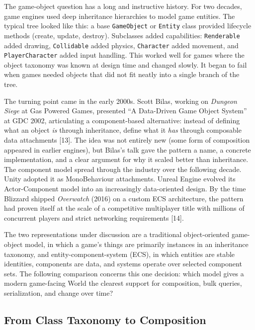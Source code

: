 \documentclass[
  11pt,
  letterpaper,
  DIV=11,
  numbers=noendperiod,
  twoside,
  open=right]{scrreprt}
\begin{document}
The game-object question has a long and instructive history. For two
decades, game engines used deep inheritance hierarchies to model game
entities. The typical tree looked like this: a base \texttt{GameObject}
or \texttt{Entity} class provided lifecycle methods (create, update,
destroy). Subclasses added capabilities: \texttt{Renderable} added
drawing, \texttt{Collidable} added physics, \texttt{Character} added
movement, and \texttt{PlayerCharacter} added input handling. This worked
well for games where the object taxonomy was known at design time and
changed slowly. It began to fail when games needed objects that did not
fit neatly into a single branch of the tree.

The turning point came in the early 2000s. Scott Bilas, working on
\emph{Dungeon Siege} at Gas Powered Games, presented ``A Data-Driven
Game Object System'' at GDC 2002, articulating a component-based
alternative: instead of defining what an object \emph{is} through
inheritance, define what it \emph{has} through composable data
attachments {[}13{]}. The idea was not entirely new (some form of
composition appeared in earlier engines), but Bilas's talk gave the
pattern a name, a concrete implementation, and a clear argument for why
it scaled better than inheritance. The component model spread through
the industry over the following decade. Unity adopted it as
MonoBehaviour attachments. Unreal Engine evolved its Actor-Component
model into an increasingly data-oriented design. By the time Blizzard
shipped \emph{Overwatch} (2016) on a custom ECS architecture, the
pattern had proven itself at the scale of a competitive multiplayer
title with millions of concurrent players and strict networking
requirements {[}14{]}.

The two representations under discussion are a traditional
object-oriented game-object model, in which a game's things are
primarily instances in an inheritance taxonomy, and
entity-component-system (ECS), in which entities are stable identities,
components are data, and systems operate over selected component sets.
The following comparison concerns this one decision: which model gives a
modern game-facing World the clearest support for composition, bulk
queries, serialization, and change over time?

\subsection{From Class Taxonomy to
Composition}\label{from-class-taxonomy-to-composition}
\end{document}

